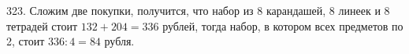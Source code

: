 323. Сложим две покупки, получится, что набор из 8 карандашей, 8 линеек и 8 тетрадей стоит $132+204=336$ рублей, тогда набор, в котором всех предметов по 2, стоит $336:4=84$ рубля.\\

